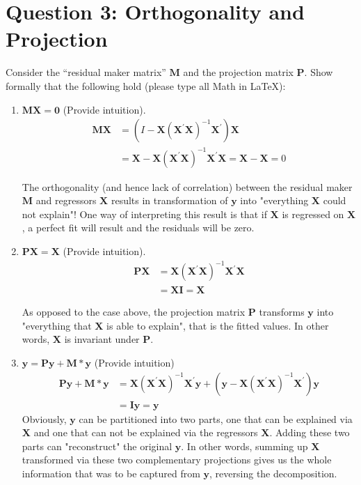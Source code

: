 \documentclass[11pt,reqno]{article}   %
\newcommand{\mlt}[1]{\mathbf{#1}} %
\newcommand{\kt}{^{\prime}}
\newcommand{\kX}{\mlt{X}}
\newcommand{\kM}{\mlt{M}}
\newcommand{\kP}{\mlt{P}}
\newcommand{\ky}{\mlt{y}}
\begin{document}
\section*{Question 3: Orthogonality and Projection}

Consider the ``residual maker matrix'' $\mlt{M}$ and the projection matrix $\mlt{P}$.
Show formally that the following hold (please type all Math in LaTeX):\\

\begin{enumerate}
\item $\kM\kX=\mlt{0}$ (Provide intuition).
\begin{align*}
\kM\kX & = (I - \kX(\kX\kt\kX)^{-1}\kX\kt)\kX \\ & = \kX-\kX(\kX\kt\kX)^{-1}\kX\kt\kX = \kX-\kX=0
\end{align*}

The orthogonality (and hence lack of correlation) between the residual maker $\kM$ and regressors $\kX$ results in transformation of $\ky$ into "everything $\kX$ could not explain"! One way of interpreting this result is that if $\kX$ is regressed on $\kX$, a perfect fit will result and the residuals will be zero.

\item $\kP\kX=\kX$   (Provide intuition).
\begin{align*}
\kP\kX & = \kX(\kX\kt\kX)^{-1}\kX\kt\kX \\ & = \kX \mlt{I} = \kX
\end{align*}

As opposed to the case above, the projection matrix $\kP$ transforms $\ky$ into "everything that $\kX$ is able to explain", that is the fitted values. In other words, $\kX$ is invariant under $\kP$.

\item $ \ky=\kP\ky + \kM*\ky$ (Provide intuition)
\begin{align*}
\kP\ky + \kM*\ky & = \kX(\kX\kt\kX)^{-1}\kX\kt\ky + (\mlt{y}-\kX(\kX\kt\kX)^{-1}\kX\kt)\ky \\ & = \mlt{I}\ky=\ky
\end{align*}
Obviously, $\ky$ can be partitioned into two parts, one that can be explained via $\kX$ and one that can not be explained via the regressors $\kX$. Adding these two parts can "reconstruct" the original $\ky$. In other words, summing up $\kX$ transformed via these two complementary projections gives us the whole information that was to be captured from $\ky$, reversing the decomposition.


\end{enumerate}
\end{document}
